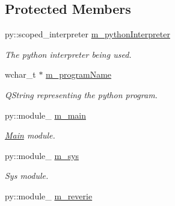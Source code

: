 \subsection*{Protected Members}
\begin{DoxyCompactItemize}
\item 
\mbox{\label{classrev_1_1_python_a_p_i_a1c48922aa02f3502559f6c8e05299444}} 
py\+::scoped\+\_\+interpreter \mbox{\hyperlink{classrev_1_1_python_a_p_i_a1c48922aa02f3502559f6c8e05299444}{m\+\_\+python\+Interpreter}}
\begin{DoxyCompactList}\small\item\em The python interpreter being used. \end{DoxyCompactList}\item 
\mbox{\label{classrev_1_1_python_a_p_i_ad1fe49031ef8b8f69a4b8b0261004f93}} 
wchar\+\_\+t $\ast$ \mbox{\hyperlink{classrev_1_1_python_a_p_i_ad1fe49031ef8b8f69a4b8b0261004f93}{m\+\_\+program\+Name}}
\begin{DoxyCompactList}\small\item\em Q\+String representing the python program. \end{DoxyCompactList}\item 
\mbox{\label{classrev_1_1_python_a_p_i_a2f47cff9f71897781a4cbc9dce665e10}} 
py\+::module\+\_\+ \mbox{\hyperlink{classrev_1_1_python_a_p_i_a2f47cff9f71897781a4cbc9dce665e10}{m\+\_\+main}}
\begin{DoxyCompactList}\small\item\em \mbox{\hyperlink{class_main}{Main}} module. \end{DoxyCompactList}\item 
\mbox{\label{classrev_1_1_python_a_p_i_a53449686d1b8e6adba66685cf2e53d78}} 
py\+::module\+\_\+ \mbox{\hyperlink{classrev_1_1_python_a_p_i_a53449686d1b8e6adba66685cf2e53d78}{m\+\_\+sys}}
\begin{DoxyCompactList}\small\item\em Sys module. \end{DoxyCompactList}\item 
\mbox{\label{classrev_1_1_python_a_p_i_a484035971cf85ffe88ce5afe78f12a78}} 
py\+::module\+\_\+ \mbox{\hyperlink{classrev_1_1_python_a_p_i_a484035971cf85ffe88ce5afe78f12a78}{m\+\_\+reverie}}

\end{DoxyCompactItemize}
